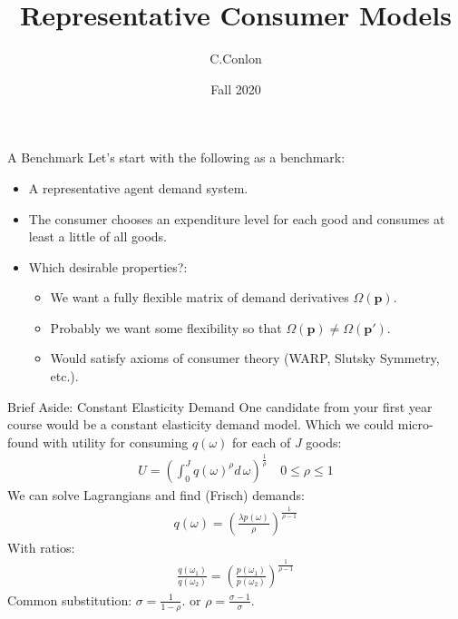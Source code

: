 \documentclass[xcolor=pdftex,dvipsnames,table,mathserif,aspectratio=169]{beamer}
\title{Representative Consumer Models}
\author{C.Conlon}
\institute{Grad IO }
\date{Fall 2020}
\begin{document}
\frame{\titlepage}

\begin{frame}{A Benchmark}
Let's start with the following as a benchmark:
\begin{itemize}
\item A \alert{representative agent} demand system. 
\item The consumer chooses an \alert{expenditure} level for each good and consumes at least a little of all goods.
\item Which desirable properties?:
\begin{itemize}
\item We want a fully flexible matrix of demand derivatives $\Omega(\mathbf{p})$.
\item Probably we want some flexibility so that $\Omega(\mathbf{p}) \neq \Omega(\mathbf{p'})$.
\item Would satisfy axioms of consumer theory (WARP, Slutsky Symmetry, etc.).
\end{itemize}
\end{itemize}
\end{frame}



\begin{frame}{Brief Aside: Constant Elasticity Demand}
One candidate from your first year course would be a \alert{constant elasticity demand model}. Which we could micro-found with utility for consuming $q(\omega)$ for each of $J$ goods:
\begin{eqnarray*}
U  = \left( \int_{0}^{J} q(\omega)^{\rho} d\, \omega \right)^{\frac{1}{\rho}} \quad 0 \leq \rho \leq 1
\end{eqnarray*}
We can solve Lagrangians and find (Frisch) demands:
\begin{eqnarray*}
q(\omega) = \left( \frac{\lambda p(\omega)}{\rho} \right)^{\frac{1}{\rho-1}}
\end{eqnarray*}
With ratios:
\begin{eqnarray*}
\frac{q(\omega_1)}{q(\omega_2)} = \left( \frac{p(\omega_1)}{p(\omega_2)} \right)^{\frac{1}{\rho-1}}
\end{eqnarray*}
Common substitution: $\sigma = \frac{1}{1-\rho}$. or $\rho = \frac{\sigma-1}{\sigma}$.
\end{frame}
\end{document}
